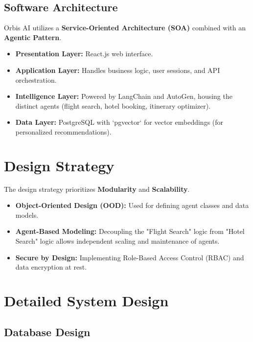 \documentclass[11pt, a4paper]{article}
\begin{document}
\newpage
\subsection{Software Architecture}
Orbis AI utilizes a \textbf{Service-Oriented Architecture (SOA)} combined with an \textbf{Agentic Pattern}.
\begin{itemize}
    \item \textbf{Presentation Layer:} React.js web interface.
    \item \textbf{Application Layer:} Handles business logic, user sessions, and API orchestration.
    \item \textbf{Intelligence Layer:} Powered by LangChain and AutoGen, housing the distinct agents (flight search, hotel booking, itinerary optimizer).
    \item \textbf{Data Layer:} PostgreSQL with `pgvector` for vector embeddings (for personalized recommendations).
\end{itemize}

\section{Design Strategy}
The design strategy prioritizes \textbf{Modularity} and \textbf{Scalability}.
\begin{itemize}
    \item \textbf{Object-Oriented Design (OOD):} Used for defining agent classes and data models.
    \item \textbf{Agent-Based Modeling:} Decoupling the "Flight Search" logic from "Hotel Search" logic allows independent scaling and maintenance of agents.
    \item \textbf{Secure by Design:} Implementing Role-Based Access Control (RBAC) and data encryption at rest.
\end{itemize}

\section{Detailed System Design}

\subsection{Database Design}
\end{document}
